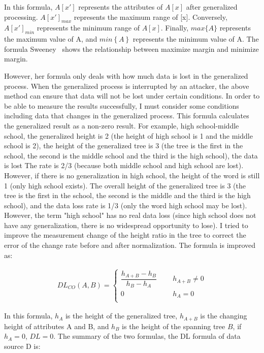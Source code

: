 \documentclass[journal,transmag]{IEEEtran}
\begin{document}
In this formula, $A [x']$ represents the attributes of $A [x]$ after generalized processing. $ A [x '] _ {max} $ represents the maximum range of [x]. Conversely, $ A [x']_{min} $ represents the minimum range of $ A [x] $. Finally, $max\{ A \}$ represents the maximum value of A, and $min\left \{ A \right \}$ represents the minimum value of A. The formula Sweeney~\cite{sweeney2002achieving} shows the relationship between maximize margin and minimize margin.  

However, her formula only deals with how much data is lost in the generalized process. When the generalized process is interrupted by an attacker, the above method can ensure that data will not be lost under certain conditions. In order to be able to measure the results successfully, I must consider some conditions including data that changes in the generalized process. This formula calculates the generalized result as a non-zero result. For example, high school-middle school, the generalized height is 2 (the height of high school is 1 and the middle school is 2), the height of the generalized tree is 3 (the tree is the first in the school, the second is the middle school and the third is the high school), the data is lost The rate is 2/3 (because both middle school and high school are lost). However, if there is no generalization in high school, the height of the word is still 1 (only high school exists). The overall height of the generalized tree is 3 (the tree is the first in the school, the second is the middle and the third is the high school), and the data loss rate is 1/3 (only the word high school may be lost). However, the term "high school" has no real data loss (since high school does not have any generalization, there is no widespread opportunity to lose). I tried to improve the measurement change of the height ratio in the tree to correct the error of the change rate before and after normalization. The formula is improved as:

\begin{eqnarray}
DL_{CO} (A, B )=\begin{cases} \dfrac { h_{A+B}-h_B}{ h_B-h_A }  \quad \ \ &
h_{A+B} \ne 0\\
0 \quad \ \ &
h_A = 0 \\
\end{cases}
\end{eqnarray}

In this formula, $ h_A $ is the height of the generalized tree, $ h_ {A + B} $ is the changing height of attributes A and B, and $ h_ {B} $ is the height of the spanning tree $ B $, if $h_A=0$, $DL = 0$. The summary of the two formulas, the DL formula of data source D is:
\end{document}
